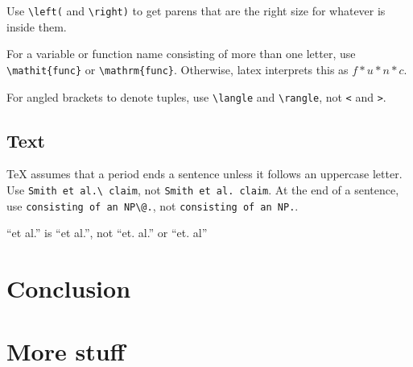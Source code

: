 \documentclass[12pt,leqno]{report}
\begin{document}
Use \verb|\left(| and \verb|\right)| to get parens that are the right size for whatever is inside them.

For a variable or function name consisting of more than one letter, use \verb|\mathit{func}| or \verb|\mathrm{func}|.  Otherwise, latex interprets this as $f*u*n*c$.

For angled brackets to denote tuples, use \verb|\langle| and \verb|\rangle|, not \verb|<| and \verb|>|.

\section{Text}

TeX assumes that a period ends a sentence unless it follows an uppercase letter.
Use \verb|Smith et al.\ claim|, not \verb|Smith et al. claim|.
At the end of a sentence, use \verb|consisting of an NP\@.|, not \verb|consisting of an NP.|.

``et al.'' is ``et al.'', not ``et. al.'' or ``et. al''

\chapter{Conclusion}




\appendix
\chapter{More stuff}
\end{document}
